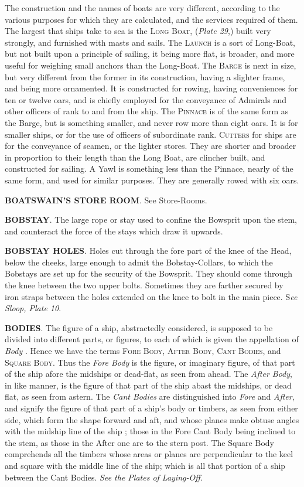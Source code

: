 The construction and the names of boats are very different, according to the various purposes for which they are calculated, and the services required of them. The largest that ships take to sea is the \textsc{Long Boat}, (\textit{Plate 29},) built very strongly, and furnished with masts and sails. The \textsc{Launch} is a sort of Long-Boat, but not built upon a principle of sailing, it being more flat, is broader, and more useful for weighing small anchors than the Long-Boat. The \textsc{Barge} is next in size, but very different from the former in its construction, having a slighter frame, and being more ornamented. It is constructed for rowing, having conveniences for ten or twelve oars, and is chiefly employed for the conveyance of Admirals and other officers of rank to and from the ship. The \textsc{Pinnace} is of the same form as the Barge, but is something smaller, and never row more than eight oars. It is for smaller ships, or for the use of officers of subordinate rank. \textsc{Cutters} for ships are for the conveyance of seamen, or the lighter stores. They are shorter and broader in proportion to their length than the Long Boat, are clincher built, and constructed for sailing. A Yawl is something less than the Pinnace, nearly of the same form, and used for similar purposes. They are generally rowed with six oars. 

\textbf{BOATSWAIN'S STORE ROOM}. See Store-Rooms. 

\textbf{BOBSTAY}. The large rope or stay used to confine the Bowsprit upon the stem, and counteract the force of the stays which draw it upwards. 

\textbf{BOBSTAY HOLES}. Holes cut through the fore part of the knee of the Head, below the cheeks, large enough to admit the Bobstay-Collars, to which the Bobstays are set up for the security of the Bowsprit. They should come through the knee between the two upper bolts. Sometimes they are farther secured by iron straps between the holes extended on the knee to bolt in the main piece. S\textit{ee Sloop, Plate 10}. 

\textbf{BODIES}. The figure of a ship, abstractedly considered, is supposed to be divided into different parts, or figures, to each of which is given the appellation of \textit{Body} . Hence we have the terms \textsc{Fore Body}, \textsc{After Body}, \textsc{Cant Bodies}, and \textsc{Square Body}. Thus the \textit{Fore Body} is the figure, or imaginary figure, of that part of the ship afore the midships or dead-flat, as seen from ahead. The \textit{After Body}, in like manner, is the figure of that part of the ship abast the midships, or dead flat, as seen from astern. The \textit{Cant Bodies} are distinguished into \textit{Fore} and \textit{After}, and signify the figure of that part of a ship’s body or timbers, as seen from either side, which form the shape forward and aft, and whose planes make obtuse angles with the midship line of the ship ; those in the Fore Cant Body being inclined to the stem, as those in the After one are to the stern post. The Square Body comprehends all the timbers whose areas or planes are perpendicular to the keel and square with the middle line of the ship; which is all that portion of a ship between the Cant Bodies. \textit{See the Plates of Laying-Off}. 

